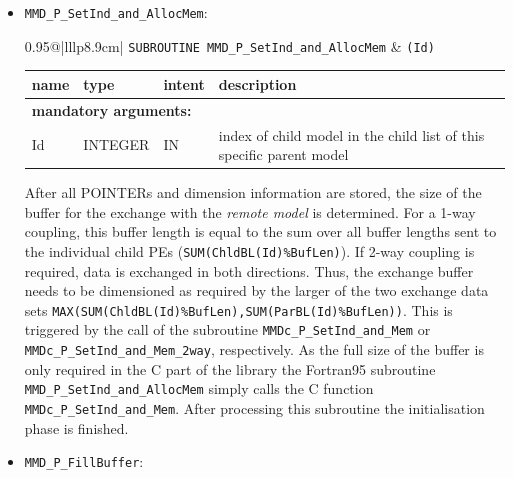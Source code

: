 \documentclass[twoside]{article}
\begin{document}
\begin{itemize}
\item  \verb|MMD_P_SetInd_and_AllocMem|:\\
\vspace*{-0.3cm}

\begin{tabular*}{0.95\textwidth}{@{\extracolsep\fill}|lllp{8.9cm}|}
\hline
{}
{\tt  SUBROUTINE MMD\_P\_SetInd\_and\_AllocMem} &
{\tt (Id)}\\
\hline
\end{tabular*}
\begin{tabular*}{0.95\textwidth}{@{\extracolsep\fill}|lllp{8.9cm}|}
name & type & intent & description\\
\hline
\multicolumn{4}{|l|}{\bf mandatory arguments:}\\
Id & {\footnotesize INTEGER} & IN &  index of child model in the child list of this specific parent model\\
\hline
\end{tabular*}
\smallskip

After all {\footnotesize POINTER}s and dimension information are
stored, the size of the buffer for the exchange with the {\it remote
model} is determined. For a 1-way coupling, this buffer length is
equal to the sum over all buffer lengths sent to the individual child
PEs (\verb|SUM(ChldBL(Id)%BufLen)|). If 2-way coupling is required,
data is exchanged in both directions. Thus, the exchange buffer needs
to be dimensioned as required by the larger of the two exchange data
sets \verb|MAX(SUM(ChldBL(Id)%BufLen),SUM(ParBL(Id)%BufLen))|.
 This is triggered by the call of the
 subroutine \verb|MMDc_P_SetInd_and_Mem|
 or \verb|MMDc_P_SetInd_and_Mem_2way|, respectively.
As the full size of the buffer is only required in the C part of the library 
the Fortran95 subroutine  \verb|MMD_P_SetInd_and_AllocMem| simply
calls the C function \verb|MMDc_P_SetInd_and_Mem|.
After processing this subroutine the initialisation phase is finished.

\item  \verb|MMD_P_FillBuffer|:\\
\vspace*{-0.3cm}


\end{itemize}
\end{document}
